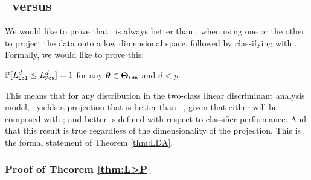 \documentclass[10pt]{article}
\begin{document}







\newpage
\subsection{\Pca~versus \Lol}


We would like to prove that \Lol~is always better than \Pca, when using one or the other to project the data onto a low dimensional space, followed by classifying with \Lda.  Formally, we would like to prove this:
\begin{thm} \label{thm:L>P}
$\mathbb{P}[L_{{\sc \texttt{Lol}}}^d \leq L_{{\sc \texttt{Pca}}}^d]=1$ for any $\boldsymbol{\theta} \in \boldsymbol{\Theta}_{{\sc \texttt{Lda}}}$  and   $d < p$.
 \end{thm}

This means that for any distribution in the two-class linear discriminant analysis model, \Lol~yields a projection that is better than \Pca~, given that either will be composed with \Lda; and better is defined with respect to classifier performance.  And that this result is true regardless of the dimensionality of the projection.  This is the formal statement of Theorem \ref{thm:LDA}.


\subsubsection{Proof of Theorem \ref{thm:L>P}}
\end{document}
